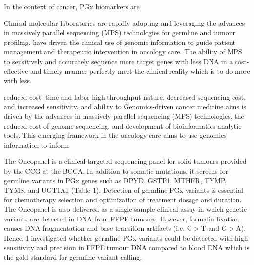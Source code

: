 In the context of cancer, PGx biomarkers are

Clinical molecular laboratories are rapidly adopting and leveraging the advances in massively parallel sequencing (MPS) technologies for germline and tumour profiling. have driven the clinical use of genomic information to guide patient management and therapeutic intervention in oncology care. The ability of MPS to sensitively and accurately sequence more target genes with less DNA in a cost-effective and timely manner perfectly meet the clinical reality which is to do more with less.

reduced cost, time and labor high throughput nature, decreased sequencing cost, and increased sensitivity, and ability to Genomics-driven cancer medicine aims is driven by the advances in massively parallel sequencing (MPS) technologies, the reduced cost of genome sequencing, and development of bioinformatics analytic tools. This emerging framework in the oncology care aims to use genomics information to inform

The Oncopanel is a clinical targeted sequencing panel for solid tumours provided by the CCG at the BCCA. In addition to somatic mutations, it screens for germline variants in PGx genes such as DPYD, GSTP1, MTHFR, TYMP, TYMS, and UGT1A1 (Table 1). Detection of germline PGx variants is essential for chemotherapy selection and optimization of treatment dosage and duration. The Oncopanel is also delivered as a single sample clinical assay in which genetic variants are detected in DNA from FFPE tumours. However, formalin fixation causes DNA fragmentation and base transition artifacts (i.e. C$>$T and G$>$A). Hence, I investigated whether germline PGx variants could be detected with high sensitivity and precision in FFPE tumour DNA compared to blood DNA which is the gold standard for germline variant calling.

